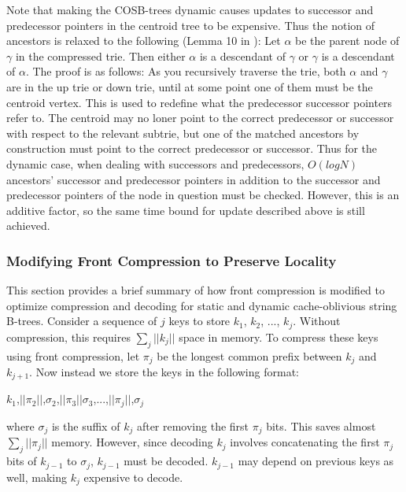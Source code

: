 \documentclass{style}
\begin{document}
Note that making the COSB-trees dynamic causes updates to successor and
predecessor pointers in the centroid tree to be expensive. Thus the notion of
ancestors is relaxed to the following (Lemma 10 in \cite{BenderFaKu06}): Let
$\alpha$ be the parent node of $\gamma$ in the compressed trie. Then either
$\alpha$ is a descendant of $\gamma$ or $\gamma$ is a descendant of $\alpha$.
The proof is as follows: As you recursively traverse the trie, both $\alpha$
and $\gamma$ are in the up trie or down trie, until at some point one of them
must be the centroid vertex. This is used to redefine what the predecessor
successor pointers refer to. The centroid may no loner point to the correct
predecessor or successor with respect to the relevant subtrie, but one of the
matched ancestors by construction must point to the correct predecessor or
successor. Thus for the dynamic case, when dealing with successors and
predecessors, $O(logN)$ ancestors' successor and predecessor pointers in
addition to the successor and predecessor pointers of the node in question
must be checked. However, this is an additive factor, so the same time bound
for update described above is still achieved.

\subsubsection{Modifying Front Compression to Preserve Locality}

This section provides a brief summary of how front compression is modified to
optimize compression and decoding for static and dynamic cache-oblivious
string B-trees. Consider a sequence of $j$ keys to store $k_{1}$, $k_{2}$,
..., $k_{j}$. Without compression, this requires $\sum_{j}||k_{j}||$ space in
memory. To compress these keys using front compression, let $\pi_{j}$ be the
longest common prefix between $k_{j}$ and $k_{j+1}$. Now instead we store the
keys in the following format:

\begin{center}
$k_{1}$,$||\pi_{2}||$,$\sigma_{2}$,$||\pi_{3}||$$\sigma_{3}$,...,$||\pi_{j}||$,$\sigma_{j}$
\end{center} 

where $\sigma_{j}$ is the suffix of $k_{j}$ after removing the first $\pi_{j}$
bits. This saves almost $\sum_{j}||\pi_{j}||$ memory. However, since decoding
$k_{j}$ involves concatenating the first $\pi_{j}$ bits of $k_{j-1}$ to
$\sigma_{j}$, $k_{j-1}$ must be decoded. $k_{j-1}$ may depend on previous keys
as well, making $k_{j}$ expensive to decode.
\end{document}
